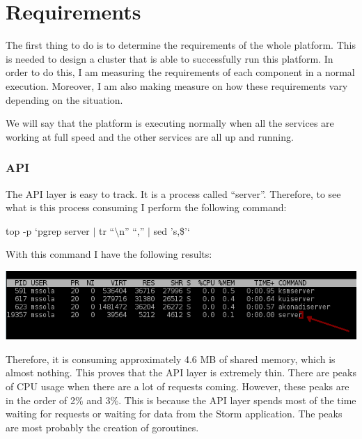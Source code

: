
\section{Requirements}
\label{sec:requirements}

The first thing to do is to determine the requirements of the whole platform.
This is needed to design a cluster that is able to successfully run this
platform. In order to do this, I am measuring the requirements of each
component in a normal execution. Moreover, I am also making measure on how
these requirements vary depending on the situation.

We will say that the platform is executing normally when all the services are
working at full speed and the other services are all up and running.

\subsubsection*{API}

The API layer is easy to track. It is a process called ``server''. Therefore,
to see what is this process consuming I perform the following command:

\begin{center}

top -p `pgrep server $|$ tr ``$\setminus$n'' ``,'' $|$ sed 's\/,\$\/\/'`

\end{center}

With this command I have the following results:

\begin{center}
  \includegraphics[scale=0.8]{hardware/images/api.png}
\end{center}

Therefore, it is consuming approximately 4.6 MB of shared memory, which is
almost nothing. This proves that the API layer is extremely thin. There are
peaks of CPU usage when there are a lot of requests coming. However, these
peaks are in the order of 2\% and 3\%. This is because the API layer spends
most of the time waiting for requests or waiting for data from the Storm
application. The peaks are most probably the creation of goroutines.

